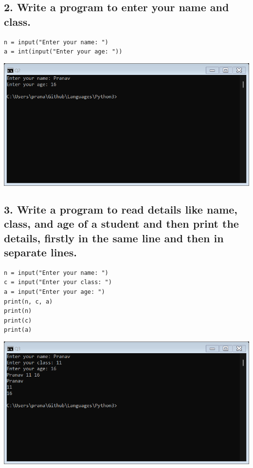 \documentclass[12pt]{article}
\begin{document}
\subsection*{2. Write a program to enter your name and class.}
\begin{verbatim}
n = input("Enter your name: ")
a = int(input("Enter your age: "))
\end{verbatim}
\includegraphics[width=\linewidth]{images/2.png}

\subsection*{3. Write a program to read details like name, class, and age of a student and then print the details, firstly in the same line and then in separate lines.}
\begin{verbatim}
n = input("Enter your name: ")
c = input("Enter your class: ")
a = input("Enter your age: ")
print(n, c, a)
print(n)
print(c)
print(a)
\end{verbatim}
\includegraphics[width=\linewidth]{images/3.png}
\end{document}

